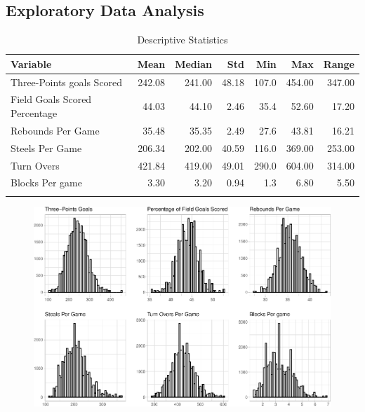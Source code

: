 \documentclass[
  man,floatsintext]{apa6}
\begin{document}
\hypertarget{exploratory-data-analysis}{%
\subsection{Exploratory Data Analysis}\label{exploratory-data-analysis}}

\begin{longtable}[t]{lrrrrrr}
\caption{\label{tab:unnamed-chunk-1}Descriptive Statistics}\\
\toprule{}
Variable & Mean & Median & Std & Min & Max & Range\\
\midrule{}
Three-Points goals Scored & 242.08 & 241.00 & 48.18 & 107.0 & 454.00 & 347.00\\
Field Goals Scored Percentage & 44.03 & 44.10 & 2.46 & 35.4 & 52.60 & 17.20\\
Rebounds Per Game & 35.48 & 35.35 & 2.49 & 27.6 & 43.81 & 16.21\\
Steels Per Game & 206.34 & 202.00 & 40.59 & 116.0 & 369.00 & 253.00\\
Turn Overs & 421.84 & 419.00 & 49.01 & 290.0 & 604.00 & 314.00\\
\addlinespace
Blocks Per game & 3.30 & 3.20 & 0.94 & 1.3 & 6.80 & 5.50\\
\bottomrule{}
\end{longtable}

\begin{figure}

{\centering \includegraphics{paper_files/figure-latex/unnamed-chunk-2-1} 

}

\caption{ }\label{fig:unnamed-chunk-2}
\end{figure}
\end{document}
